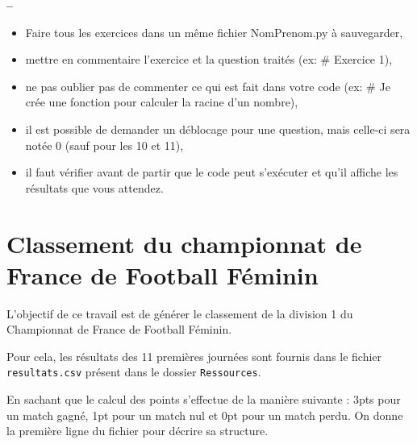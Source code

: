 


\usepackage{enumitem}







\begin{center}
{\Large\bf {\type} \no {\numero} -- \descrip}
\end{center}


\begin{boxedminipage}{.9\textwidth} 
\begin{itemize}
 \item Faire tous les exercices dans un même fichier {NomPrenom.py} à sauvegarder,
 \item mettre en commentaire l'exercice et la question traités (ex: \# Exercice 1),
 \item ne pas oublier pas de commenter ce qui est fait dans votre code (ex: \# Je crée une fonction pour calculer la racine d'un nombre),
 \item il est possible de demander un déblocage pour une question, mais celle-ci sera notée 0 (sauf pour les 10 et 11),
 \item il faut vérifier avant de partir que le code peut s'exécuter et qu'il affiche les résultats que vous attendez.
\end{itemize}
\end{boxedminipage}

\section*{Classement du championnat de France de Football Féminin}

L'objectif de ce travail est de générer le classement de la division 1 du Championnat de France de Football Féminin.

Pour cela, les résultats des 11 premières journées sont fournis dans le fichier \verb?resultats.csv? présent dans le dossier \verb?Ressources?.

En sachant que le calcul des points s'effectue de la manière suivante : 3pts pour un match gagné, 1pt pour un match nul et 0pt pour un match perdu. On donne la première ligne du fichier pour décrire sa structure.

